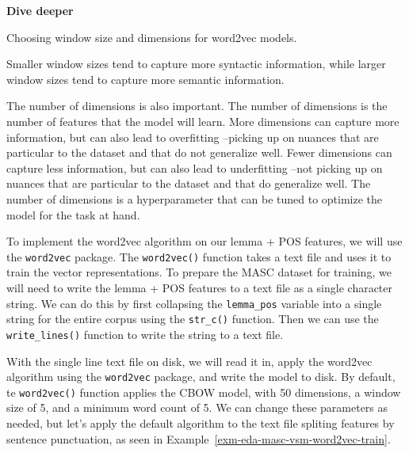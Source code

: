 \documentclass[
  letterpaper,
  DIV=11,
  numbers=noendperiod]{scrreprt}
\theoremstyle{definition}
\theoremstyle{remark}
\begin{document}
\begin{tcolorbox}[enhanced jigsaw, leftrule=.75mm, colframe=quarto-callout-color-frame, colback=white, rightrule=.15mm, opacityback=0, arc=.35mm, breakable, bottomrule=.15mm, left=2mm, toprule=.15mm]

\textbf{ Dive deeper}

Choosing window size and dimensions for word2vec models.

Smaller window sizes tend to capture more syntactic information, while
larger window sizes tend to capture more semantic information.

The number of dimensions is also important. The number of dimensions is
the number of features that the model will learn. More dimensions can
capture more information, but can also lead to overfitting --picking up
on nuances that are particular to the dataset and that do not generalize
well. Fewer dimensions can capture less information, but can also lead
to underfitting --not picking up on nuances that are particular to the
dataset and that do generalize well. The number of dimensions is a
hyperparameter that can be tuned to optimize the model for the task at
hand.

\end{tcolorbox}

To implement the word2vec algorithm on our lemma + POS features, we will
use the \texttt{word2vec} package. The \texttt{word2vec()} function
takes a text file and uses it to train the vector representations. To
prepare the MASC dataset for training, we will need to write the lemma +
POS features to a text file as a single character string. We can do this
by first collapsing the \texttt{lemma\_pos} variable into a single
string for the entire corpus using the \texttt{str\_c()} function. Then
we can use the \texttt{write\_lines()} function to write the string to a
text file.

With the single line text file on disk, we will read it in, apply the
word2vec algorithm using the \texttt{word2vec} package, and write the
model to disk. By default, te \texttt{word2vec()} function applies the
CBOW model, with 50 dimensions, a window size of 5, and a minimum word
count of 5. We can change these parameters as needed, but let's apply
the default algorithm to the text file spliting features by sentence
punctuation, as seen in Example~\ref{exm-eda-masc-vsm-word2vec-train}.
\end{document}
